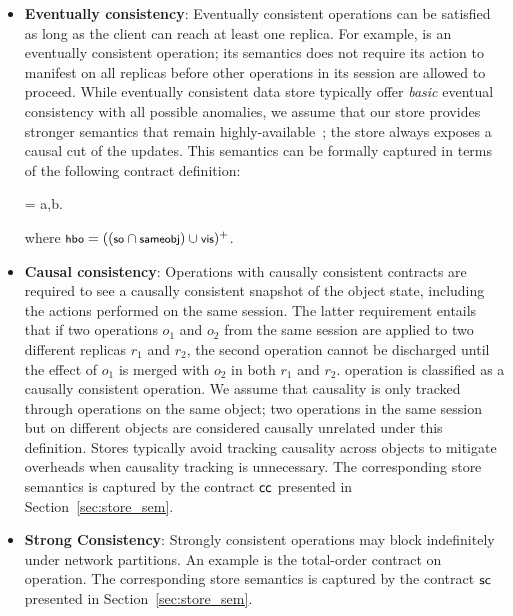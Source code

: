 \begin{itemize}
\setlength{\itemsep}{2pt}

\item \textbf{Eventually consistency}: Eventually consistent operations can
	be satisfied as long as the client can reach at least one replica. For
	example,  is an eventually consistent operation; its semantics
	does not require its action to manifest on all replicas before other
	operations in its session are allowed to proceed. While eventually consistent
	data store typically offer \emph{basic} eventual consistency with all
	possible anomalies, we assume that our store provides stronger semantics that
	remain highly-available~\cite{BailisHAT,COPS}; the store always exposes a
	causal cut of the updates. This semantics can be formally captured in terms
	of the following contract definition:

\vspace{-1em}
\begin{smathpar}
\ecc = \forall a,b. ~ \wedge {} \Rightarrow {}
\end{smathpar}
\noindent where $\small \hboZ = ((\soZ \cap \sameobjZ) \cup \visZ)^+$.

\item \textbf{Causal consistency}: Operations with causally consistent
	contracts are required to see a causally consistent snapshot of the object
	state, including the actions performed on the same session.  The latter
	requirement entails that if two operations $o_1$ and $o_2$ from the same
	session are applied to two different replicas $r_1$ and $r_2$, the second
	operation cannot be discharged until the effect of $o_1$ is merged with $o_2$
	in both $r_1$ and $r_2$.   operation is classified as a
	causally consistent operation. We assume that causality is only tracked
	through operations on the same object; two operations in the same session but
	on different objects are considered causally unrelated under this definition.
	Stores typically avoid tracking causality across objects to mitigate
	overheads when causality tracking is unnecessary.  The corresponding store
	semantics is captured by the contract ${\sf cc}$ presented in
	Section~\ref{sec:store_sem}.

\item \textbf{Strong Consistency}: Strongly consistent operations may block
  indefinitely under network partitions. An example is the total-order
  contract on  operation. The corresponding store semantics is
  captured by the contract ${\sf sc}$ presented in Section~\ref{sec:store_sem}.

\end{itemize}

